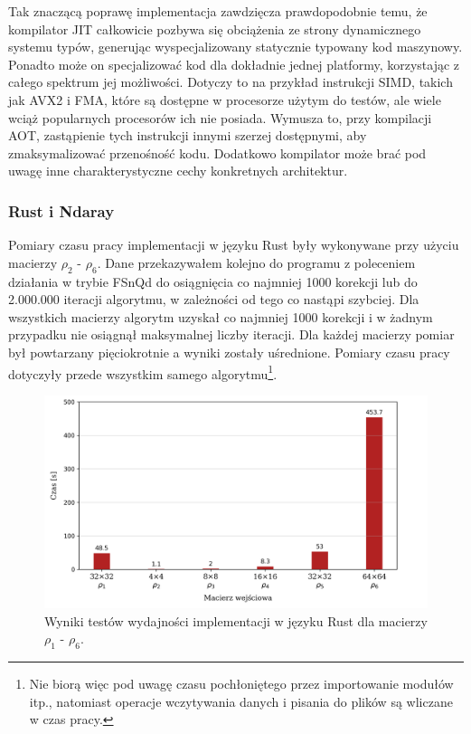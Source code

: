 \documentclass[11pt, a4paper]{article}
\begin{document}
\begin{sloppypar}
    Tak znaczącą poprawę implementacja zawdzięcza prawdopodobnie temu, że kompilator JIT
    całkowicie pozbywa się obciążenia ze strony dynamicznego systemu typów, generując
    wyspecjalizowany statycznie typowany kod maszynowy. Ponadto może on specjalizować kod
    dla dokładnie jednej platformy, korzystając z całego spektrum jej możliwości. Dotyczy
    to na przykład instrukcji SIMD, takich jak AVX2 i FMA, które są dostępne w procesorze
    użytym do testów, ale wiele wciąż popularnych procesorów ich nie posiada. Wymusza to,
    przy kompilacji AOT, zastąpienie tych instrukcji innymi szerzej dostępnymi, aby
    zmaksymalizować przenośność kodu. Dodatkowo kompilator może brać pod uwagę inne charakterystyczne
    cechy konkretnych architektur.

    \FloatBarrier

    \subsubsection{ Rust i Ndaray}


    Pomiary czasu pracy implementacji w języku Rust były wykonywane przy użyciu macierzy
    $\rho_{2}$ - $\rho_{6}$. Dane przekazywałem kolejno do programu z poleceniem działania
    w trybie FSnQd do osiągnięcia co najmniej 1000 korekcji lub do 2.000.000 iteracji
    algorytmu, w zależności od tego co nastąpi szybciej. Dla wszystkich macierzy
    algorytm uzyskał co najmniej 1000 korekcji i w żadnym przypadku nie osiągnął
    maksymalnej liczby iteracji. Dla każdej macierzy pomiar był powtarzany pięciokrotnie
    a wyniki zostały uśrednione. Pomiary czasu pracy dotyczyły przede wszystkim samego
    algorytmu\footnote{Nie biorą więc pod uwagę czasu pochłoniętego przez importowanie modułów
    itp., natomiast operacje wczytywania danych i pisania do plików są wliczane w czas pracy.}.

    \begin{figure}[ht]
      \centering
      \includegraphics[width=1.0\textwidth]{"resources/rust_performance_tests.png"}
      \caption{Wyniki testów wydajności implementacji w języku Rust dla macierzy $\rho_{1}$ - $\rho
      _{6}$.}
      \label{rust-double-precision}
    \end{figure}


\end{sloppypar}
\end{document}
